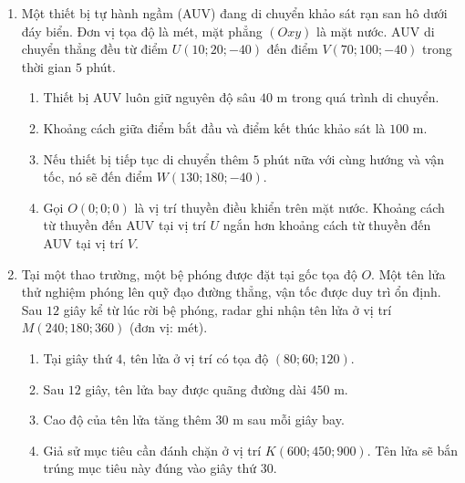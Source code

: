 \documentclass[12pt]{article}
\begin{document}
\begin{enumerate}[label=\textbf{Câu \arabic*:}, leftmargin=*]
		\begin{enumerate}[label=\alph*)]
			\item Khoảng cách từ trung tâm điều phối đến vị trí tàu cá là hơn $100\text{ km}$.
			\item Ở phút thứ $15$, trực thăng đang ở độ cao $1\text{ km}$ so với mặt nước biển $(Oxy)$.
			\item Tốc độ bay của trực thăng là $200\text{ km/h}$.
			\item Tọa độ của trực thăng ở phút thứ $10$ là $(20; \frac{80}{3}; \frac{2}{3})$.
		\end{enumerate}
		
		\vspace{3mm}
		\item
		Một thiết bị tự hành ngầm (AUV) đang di chuyển khảo sát rạn san hô dưới đáy biển. Đơn vị tọa độ là mét, mặt phẳng $(Oxy)$ là mặt nước. AUV di chuyển thẳng đều từ điểm $U(10; 20; -40)$ đến điểm $V(70; 100; -40)$ trong thời gian $5$ phút.
		
		\begin{enumerate}[label=\alph*)]
			\item Thiết bị AUV luôn giữ nguyên độ sâu $40\text{ m}$ trong quá trình di chuyển.
			\item Khoảng cách giữa điểm bắt đầu và điểm kết thúc khảo sát là $100\text{ m}$.
			\item Nếu thiết bị tiếp tục di chuyển thêm $5$ phút nữa với cùng hướng và vận tốc, nó sẽ đến điểm $W(130; 180; -40)$.
			\item Gọi $O(0;0;0)$ là vị trí thuyền điều khiển trên mặt nước. Khoảng cách từ thuyền đến AUV tại vị trí $U$ ngắn hơn khoảng cách từ thuyền đến AUV tại vị trí $V$.
		\end{enumerate}
		
		\vspace{3mm}
		\item
		Tại một thao trường, một bệ phóng được đặt tại gốc tọa độ $O$. Một tên lửa thử nghiệm phóng lên quỹ đạo đường thẳng, vận tốc được duy trì ổn định. Sau $12$ giây kể từ lúc rời bệ phóng, radar ghi nhận tên lửa ở vị trí $M(240; 180; 360)$ (đơn vị: mét).
		
		\begin{enumerate}[label=\alph*)]
			\item Tại giây thứ $4$, tên lửa ở vị trí có tọa độ $(80; 60; 120)$.
			\item Sau $12$ giây, tên lửa bay được quãng đường dài $450\text{ m}$.
			\item Cao độ của tên lửa tăng thêm $30\text{ m}$ sau mỗi giây bay.
			\item Giả sử mục tiêu cần đánh chặn ở vị trí $K(600; 450; 900)$. Tên lửa sẽ bắn trúng mục tiêu này đúng vào giây thứ $30$.
		\end{enumerate}
			

\end{enumerate}
\end{document}
